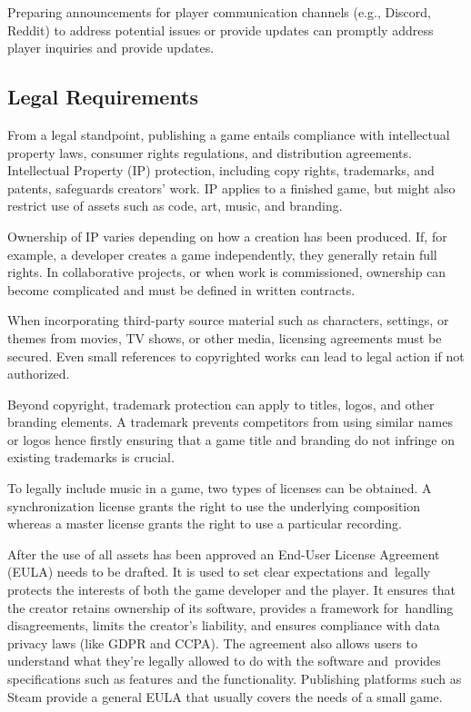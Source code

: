 Preparing announcements for player communication channels (e.g., Discord, Reddit) to address potential issues or provide updates can promptly address player inquiries and provide updates.\cite{palmer_planning-launch, edgegap_pre-launch-list}

\subsection{Legal Requirements}
From a legal standpoint, publishing a game entails compliance with intellectual property laws, consumer rights regulations, and distribution agreements. Intellectual Property (IP) protection, including copy rights, trademarks, and patents, safeguards creators’ work. IP applies to a finished game, but might also restrict use of assets such as code, art, music, and branding.\cite{jd-supra_ip}

Ownership of IP varies depending on how a creation has been produced. If, for example, a developer creates a game independently, they generally retain full rights. In collaborative projects, or when work is commissioned, ownership can become complicated and must be defined in written contracts.\cite{silva_guide-to-release, jd-supra_ip}

When incorporating third-party source material such as characters, settings, or themes from movies, TV shows, or other media, licensing agreements must be secured. Even small references to copyrighted works can lead to legal action if not authorized.\cite{silva_guide-to-release, jd-supra_ip}

Beyond copyright, trademark protection can apply to titles, logos, and other branding elements. A trademark prevents competitors from using similar names or logos hence firstly ensuring that a game title and branding do not infringe on existing trademarks is crucial.\cite{dragon_copyright}

To legally include music in a game, two types of licenses can be obtained. A synchronization license grants the right to use the underlying composition whereas a master license grants the right to use a particular recording.\cite{iconcollective_music-license}

After the use of all assets has been approved an End-User License Agreement (EULA) needs to be drafted.\cite{silva_guide-to-release} It is used to set clear expectations and~legally protects the interests of both the game developer and the player. It ensures that the creator retains ownership of its software, provides a framework for~handling disagreements, limits the creator’s liability, and ensures compliance with data privacy laws (like GDPR and CCPA). The agreement also allows users to understand what they're legally allowed to do with the software and~provides specifications such as features and the functionality. Publishing platforms such as Steam provide a general EULA that usually covers the needs of a small game.\cite{docupilot_eula, steam_content-survey}

